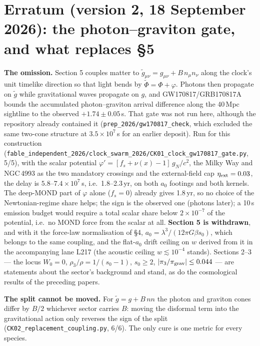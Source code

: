 \documentclass[11pt,letterpaper]{article}
\begin{document}
\section*{Erratum (version 2, 18 September 2026): the photon--graviton gate, and what replaces \S5}
\textbf{The omission.} Section 5 couples matter to $\tilde g_{\mu\nu}=g_{\mu\nu}+B\,n_\mu n_\nu$ along the clock's unit timelike direction so that light bends by $\tilde\Phi=\Phi+\varphi$. Photons then propagate on $\tilde g$ while gravitational waves propagate on $g$, and GW170817/GRB170817A bounds the accumulated photon--graviton arrival difference along the 40\,Mpc sightline to the observed $+1.74\pm0.05$\,s. That gate was not run here, although the repository already contained it (\texttt{prep\_2026/gw170817\_check}, which excluded the same two-cone structure at $3.5\times10^{7}$\,s for an earlier deposit). Run for this construction (\texttt{fable\_independent\_2026/}\allowbreak\texttt{clock\_swarm\_2026/}\allowbreak\texttt{CK01\_clock\_gw170817\_gate.py}, 5/5), with the scalar potential $\varphi'=[f_s+\nu(x)-1]\,g_N/c^2$, the Milky Way and NGC\,4993 as the two mandatory crossings and the external-field cap $\eta_{\rm ext}=0.03$, the delay is $5.8$--$7.4\times10^{7}$\,s, i.e.\ 1.8--2.3\,yr, on both $a_0$ footings and both kernels. The deep-MOND part of $\varphi$ alone ($f_s=0$) already gives 1.8\,yr, so no choice of the Newtonian-regime share helps; the sign is the observed one (photons later); a 10\,s emission budget would require a total scalar share below $2\times10^{-7}$ of the potential, i.e.\ no MOND force from the scalar at all. \textbf{Section 5 is withdrawn}, and with it the force-law normalisation of \S4, $a_0=\lambda^3/(12\pi G\beta s_0)$, which belongs to the same coupling, and the flat-$a_0$ drift ceiling on $w$ derived from it in the accompanying lane L217 (the acoustic ceiling $w\lesssim10^{-4}$ stands). Sections 2--3 --- the locus $W_0=0$, $\rho_3/\rho=1/(s_0-1)$, $s_0\ge2$, $|\pi_3/\pi_{\rm grav}|\le0.044$ --- are statements about the sector's background and stand, as do the cosmological results of the preceding papers.

\textbf{The split cannot be moved.} For $\tilde g=g+B\,nn$ the photon and graviton cones differ by $B/2$ whichever sector carries $B$: moving the disformal term into the gravitational action only reverses the sign of the split (\texttt{CK02\_replacement\_coupling.py}, 6/6). The only cure is one metric for every species.
\end{document}
